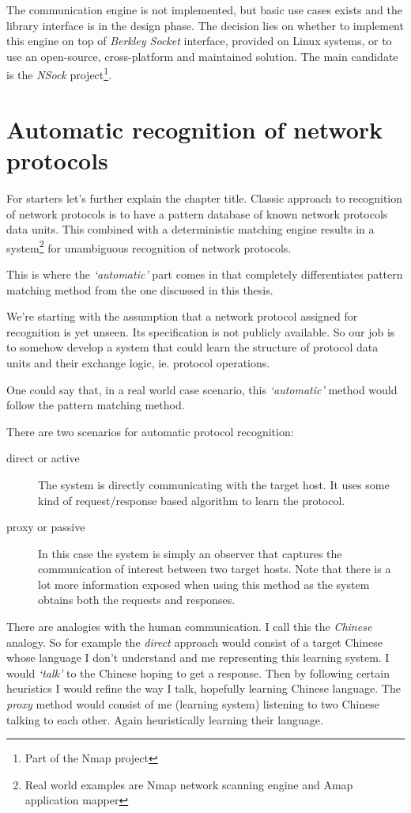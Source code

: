 \documentclass[times, utf8, diplomski]{fer}
\begin{document}
The communication engine is not implemented, but basic use cases exists and the
library interface is in the design phase. The decision lies on whether to implement
this engine on top of \emph{Berkley Socket} interface, provided on Linux systems,
or to use an open-source, cross-platform and maintained solution. The main candidate
is the \emph{NSock} project\footnote{Part of the Nmap project}.

\chapter{Automatic recognition of network protocols}
\label{ch:aut_rec}
For starters let's further explain the chapter title. Classic approach to 
recognition of network protocols is to have a pattern database of 
known network protocols data units. This combined with a deterministic matching 
engine results in a system\footnote{Real world examples are Nmap network scanning
engine and Amap application mapper} for unambiguous recognition of network protocols.

This is where the \emph{`automatic'} part comes in that completely differentiates
pattern matching method from the one discussed in this thesis.

We're starting with the assumption that a network protocol assigned for recognition
is yet unseen. Its specification is not publicly available. So our job is to somehow 
develop a system that could learn the structure of protocol data units and their 
exchange logic, ie. protocol operations.

One could say that, in a real world case scenario, this \emph{`automatic'} method 
would follow the pattern matching method.

There are two scenarios for automatic protocol recognition:
\begin{description}
	\item[direct or active] The system is directly communicating with the target 
		host. It uses some kind of request/response based algorithm to learn the 
		protocol.
	\item[proxy or passive] In this case the system is simply an observer that
		captures the communication of interest between two target hosts. Note that
		there is a lot more information exposed when using this method as the system
		obtains both the requests and responses.
\end{description}

There are analogies with the human communication. I call this the \emph{Chinese} 
analogy. So for example the \emph{direct} approach would consist of a target Chinese
whose language I don't understand and me representing this learning system. I would
\emph{`talk'} to the Chinese hoping to get a response. Then by following certain
heuristics I would refine the way I talk, hopefully learning Chinese language.
The \emph{proxy} method would consist of me (learning system) listening to two
Chinese talking to each other. Again heuristically learning their language.
\end{document}
